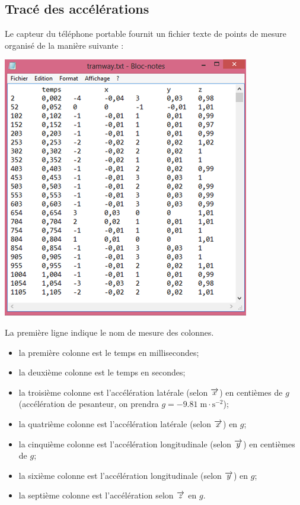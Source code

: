 \documentclass[10pt,fleqn]{article} %
\begin{document}
\begin{multicols}{2}
\subsection*{Tracé des accélérations}
Le capteur du téléphone portable fournit un fichier texte de points de mesure organisé de la manière suivante :

\begin{center}
\includegraphics[width=.8\linewidth]{images/fig_03}
\end{center}

La première ligne indique le nom de mesure des colonnes.
\begin{itemize}
\item la première colonne est le temps en millisecondes;
\item la deuxième colonne est le temps en secondes;
\item la troisième colonne est l’accélération latérale (selon $\overrightarrow{x}$) en centièmes de 
$g$ (accélération de pesanteur, on prendra $g=-9.81\;\text{m}\cdot \text{s}^{-2}$);
\item la quatrième colonne est l’accélération latérale (selon $\overrightarrow{x}$) en $g$;
\item la cinquième colonne est l’accélération longitudinale (selon $\overrightarrow{y}$) en centièmes de $g$;
\item la sixième colonne est l’accélération longitudinale (selon $\overrightarrow{y}$) en $g$;
\item la septième colonne est l’accélération selon $\overrightarrow{z}$ en $g$.
\end{itemize}


\end{multicols}
\end{document}
